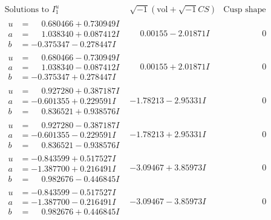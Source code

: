 \documentclass[1p]{elsarticle_modified}
\theoremstyle{definition}
\newcommand{\I}{\sqrt{-1}}
\begin{document}
$$\begin{array}{c|c|c}  
\text{Solutions to }I^u_{1}& \I (\text{vol} + \sqrt{-1}CS) & \text{Cusp shape}\\
 \hline 
\begin{aligned}
u &= \phantom{-}0.680466 + 0.730949 I \\
a &= \phantom{-}1.038340 + 0.087412 I \\
b &= -0.375347 - 0.278447 I\end{aligned}
 & \phantom{-}0.00155 - 2.01871 I & \phantom{-0.000000 } 0 \\ \hline\begin{aligned}
u &= \phantom{-}0.680466 - 0.730949 I \\
a &= \phantom{-}1.038340 - 0.087412 I \\
b &= -0.375347 + 0.278447 I\end{aligned}
 & \phantom{-}0.00155 + 2.01871 I & \phantom{-0.000000 } 0 \\ \hline\begin{aligned}
u &= \phantom{-}0.927280 + 0.387187 I \\
a &= -0.601355 + 0.229591 I \\
b &= \phantom{-}0.836521 + 0.938576 I\end{aligned}
 & -1.78213 - 2.95331 I & \phantom{-0.000000 } 0 \\ \hline\begin{aligned}
u &= \phantom{-}0.927280 - 0.387187 I \\
a &= -0.601355 - 0.229591 I \\
b &= \phantom{-}0.836521 - 0.938576 I\end{aligned}
 & -1.78213 + 2.95331 I & \phantom{-0.000000 } 0 \\ \hline\begin{aligned}
u &= -0.843599 + 0.517527 I \\
a &= -1.387700 + 0.216491 I \\
b &= \phantom{-}0.982676 - 0.446845 I\end{aligned}
 & -3.09467 + 3.85973 I & \phantom{-0.000000 } 0 \\ \hline\begin{aligned}
u &= -0.843599 - 0.517527 I \\
a &= -1.387700 - 0.216491 I \\
b &= \phantom{-}0.982676 + 0.446845 I\end{aligned}
 & -3.09467 - 3.85973 I & \phantom{-0.000000 } 0 \\ \hline\begin{aligned}

\end{aligned}
\end{array}$$
\end{document}
